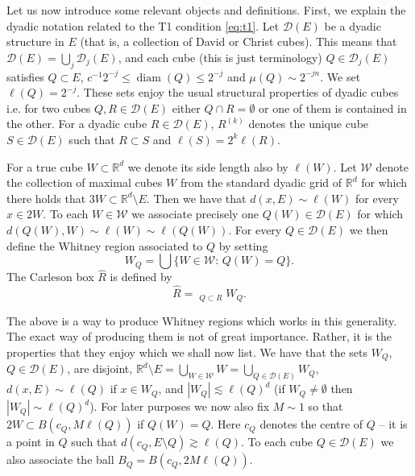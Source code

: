 \documentclass[11pt,a4paper,leqno]{amsart}
\newcommand{\R}{\mathbb{R}}
\newcommand{\diam}{\operatorname{diam}}
\numberwithin{equation}{section}
\theoremstyle{plain}
\theoremstyle{definition}
\theoremstyle{remark}
\begin{document}
Let us now introduce some relevant objects and definitions. First, we explain the dyadic notation related to the T1 condition \eqref{eq:t1}.
Let $\mathcal{D}(E)$ be a dyadic structure in $E$ (that is, a collection of David or Christ cubes).
This means that $\mathcal{D}(E) = \bigcup_j \mathcal{D}_j(E)$, and each cube (this is just terminology) $Q \in \mathcal{D}_j(E)$
satisfies $Q \subset E$, $c^{-1}2^{-j} \le \diam(Q) \le 2^{-j}$ and $\mu(Q) \sim 2^{-jn}$. We set $\ell(Q) = 2^{-j}$. These sets enjoy the usual structural properties of dyadic cubes
i.e. for two cubes $Q, R \in \mathcal{D}(E)$ either $Q \cap R = \emptyset$ or one of them is contained in the other. For a dyadic cube $R \in \mathcal D(E) $, $R^{(k)}$ denotes the unique cube $S \in \mathcal D(E)$ such that $R \subset S$ and $\ell(S) = 2^k\ell(R)$.

For a true cube $W \subset \R^{d}$ we denote its side length also by $\ell(W)$.
Let $\mathcal{W}$ denote the collection of maximal cubes $W$ from the standard dyadic grid of $\R^{d}$ for which there holds that $3W \subset \R^{d} \setminus E$.
Then we have that $d(x, E) \sim \ell(W)$ for every $x \in 2W$. To each $W \in \mathcal{W}$ we associate precisely one $Q(W) \in \mathcal{D}(E)$ for which $d(Q(W), W) \sim \ell(W) \sim \ell(Q(W))$.
For every $Q \in \mathcal{D}(E)$ we then define the Whitney region associated to $Q$ by setting
\begin{displaymath}
W_Q = \bigcup \{W \in \mathcal{W}\colon\, Q(W) = Q\}.
\end{displaymath}
The Carleson box $\widehat R$ is defined by
\begin{displaymath}
\widehat R = \mathop{\bigcup_{Q \in \mathcal{D}(E)}}_{Q \subset R} W_Q.
\end{displaymath}

The above is a way to produce Whitney regions which works in this generality. The exact way of producing them is not of great importance. Rather, it is the properties that they enjoy which we shall now list.
We have that the sets $W_Q$, $Q \in \mathcal{D}(E)$, are disjoint, $\R^{d} \setminus E = \bigcup_{W \in \mathcal{W}} W =  \bigcup_{Q \in \mathcal{D}(E)} W_Q$, $d(x,E) \sim \ell(Q)$
if $x \in W_Q$, and $|W_Q| \lesssim \ell(Q)^{d}$ (if $W_Q \neq \emptyset$ then $|W_Q| \sim \ell(Q)^{d}$). For later purposes we now also fix $M \sim 1$ so that $2W \subset B(c_Q, M\ell(Q))$
if $Q(W) = Q$. Here $c_Q$ denotes the centre of $Q$ -- it is a point in $Q$ such that $d(c_Q, E \setminus Q) \gtrsim \ell(Q)$. To each cube $Q \in \mathcal{D}(E)$ we also associate the ball
$B_Q = B(c_Q, 2M\ell(Q))$. 
\end{document}
